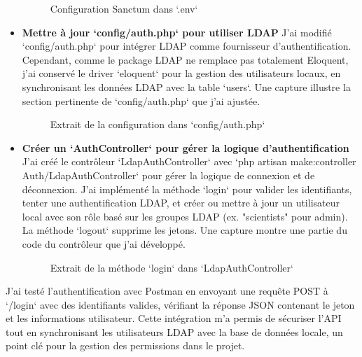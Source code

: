 \begin{itemize}
      \begin{figure}[h]
          \centering
          \caption{Configuration Sanctum dans `.env`}
          \label{fig:sanctum_env_config}
      \end{figure}
      
    \item \textbf{Mettre à jour `config/auth.php` pour utiliser LDAP}  
      J’ai modifié `config/auth.php` pour intégrer LDAP comme fournisseur d’authentification. Cependant, comme le package LDAP ne remplace pas totalement Eloquent, j’ai conservé le driver `eloquent` pour la gestion des utilisateurs locaux, en synchronisant les données LDAP avec la table `users`. Une capture illustre la section pertinente de `config/auth.php` que j’ai ajustée.
      
      \begin{figure}[h]
          \centering
          \caption{Extrait de la configuration dans `config/auth.php`}
          \label{fig:auth_config_file}
      \end{figure}
      
    \item \textbf{Créer un `AuthController` pour gérer la logique d’authentification}  
      J’ai créé le contrôleur `LdapAuthController` avec `php artisan make:controller Auth/LdapAuthController` pour gérer la logique de connexion et de déconnexion. J’ai implémenté la méthode `login` pour valider les identifiants, tenter une authentification LDAP, et créer ou mettre à jour un utilisateur local avec son rôle basé sur les groupes LDAP (ex. "scientists" pour admin). La méthode `logout` supprime les jetons. Une capture montre une partie du code du contrôleur que j’ai développé.
      
      \begin{figure}[h]
          \centering
          \caption{Extrait de la méthode `login` dans `LdapAuthController`}
          \label{fig:ldap_auth_controller}
      \end{figure}
\end{itemize}

J’ai testé l’authentification avec Postman en envoyant une requête POST à `/login` avec des identifiants valides, vérifiant la réponse JSON contenant le jeton et les informations utilisateur. Cette intégration m’a permis de sécuriser l’API tout en synchronisant les utilisateurs LDAP avec la base de données locale, un point clé pour la gestion des permissions dans le projet.

